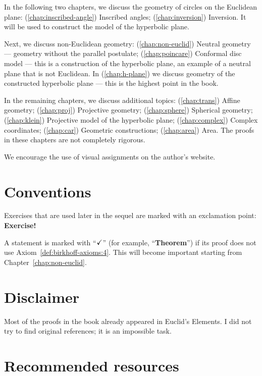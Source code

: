 In the following two chapters, we discuss the geometry of circles on the Euclidean plane:
(\ref{chap:inscribed-angle}) Inscribed angles; (\ref{chap:inversion}) Inversion.
It  will be used to construct the model of the hyperbolic plane.

Next, we discuss non-Euclidean geometry:
(\ref{chap:non-euclid})
Neutral geometry --- geometry without the parallel postulate;
(\ref{chap:poincare})
Conformal disc model ---
this is a construction of the hyperbolic plane,
an example of a neutral plane that is not Euclidean.
In (\ref{chap:h-plane}) we discuss geometry of the constructed hyperbolic plane --- this is the highest point in the book.

In the remaining chapters, we discuss additional topics:
(\ref{chap:trans}) Affine geometry;
(\ref{chap:proj}) Projective geometry;
(\ref{chap:sphere}) Spherical geometry;
(\ref{chap:klein}) Projective model of the hyperbolic plane;
(\ref{chap:complex}) Complex coordinates;
(\ref{chap:car}) Geometric constructions;
(\ref{chap:area}) Area.
The proofs in these chapters are not completely rigorous.

We encourage the use of visual assignments on the author's website.

\section{Conventions}

Exercises that are used later in the sequel are marked with an exclamation point: \textbf{Exercise!}

A statement is marked with ``$\checkmark$''\label{a-mark} (for example, ``\textbf{Theorem\abs}'') if its proof does not use Axiom~\ref{def:birkhoff-axioms:4}.
This will become important starting from Chapter~\ref{chap:non-euclid}.


\section{Disclaimer}
 
Most of the proofs in the book already appeared in Euclid's Elements.
I did not try to find original references; it is an impossible task.

\section{Recommended resources}

